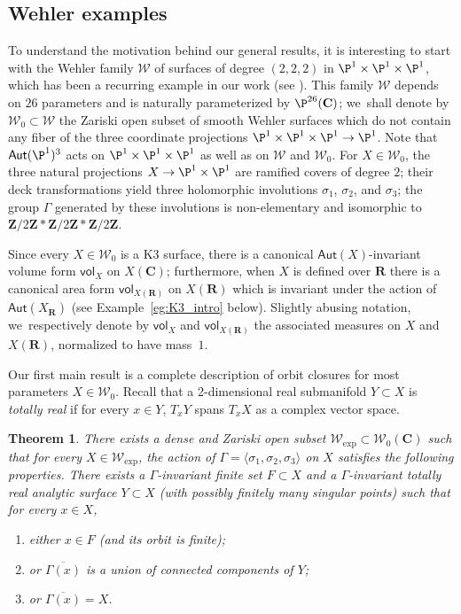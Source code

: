 \documentclass[JEP,XML,SOM,Unicode,published]{cedram}
\newenvironment{enumeratea}
{\bgroup\def\theenumi{\alph{enumi}}\begin{enumerate}}
{\end{enumerate}\egroup}
\def\C{\mathbf{C}}
\def\R{\mathbf{R}}
\def\Z{\mathbf{Z}}
\newcommand{\cW}{\mathcal{W}}
\newcommand\Aut{\mathsf{Aut}}
\newcommand{\vol}{{\mathsf{vol}}}
\theoremstyle{plain}
\newtheorem{thm}{Theorem}[section]
\theoremstyle{definition}
\begin{document}
\subsection{Wehler examples} \label{subs:wehler}
To understand the motivation behind our general results,
it is interesting to start with the Wehler family $ \cW$ of
surfaces of degree $(2,2,2)$ in $\P^1\times \P^1\times \P^1$, which has been a
recurring example in our work (see \eg \cite[\S 3]{stiffness}).
This family $ \cW$ depends on $26$ parameters and is naturally parameterized by
$\P^{26}(\C)$; we~shall denote by $ \cW_0\subset \cW$ the
Zariski open subset of smooth Wehler surfaces which do not contain any fiber of the three coordinate projections $\P^1\times \P^1\times \P^1\to \P^1$. Note that $\Aut(\P^1)^3$ acts on $\P^1\times\P^1\times \P^1$ as well as on $\cW$ and $\cW_0$.
For $X\in \cW_0$, the three natural projections $X\to \P^1\times \P^1$ are ramified covers of degree $2$; their deck transformations yield three holomorphic
involutions $\sigma_1$, $\sigma_2$, and $\sigma_3$;
the group $\Gamma$ generated by these involutions is non-elementary and isomorphic to
$\Z/2\Z\ast\Z/2\Z\ast\Z/2\Z$.

Since every $X\in \cW_0$ is a K3 surface,
there is a canonical $\Aut(X)$-invariant volume form $\vol_X$ on $X(\C)$; furthermore,
when $X$ is defined over $\R$ there is a canonical area form $\vol_{X(\R)}$
on $X(\R)$ which is invariant under the action of $\Aut(X_\R)$ (see Example~\ref{eg:K3_intro} below).
Slightly abusing notation, we~respectively denote by $\vol_X$ and $\vol_{X(\R)}$
the associated measures on $X$ and $X(\R)$, normalized to
have mass~$1$.

Our first main result is a complete description of orbit closures for
most parameters $X\in \cW_0$.
Recall that a 2-dimensional real submanifold
$Y\subset X$ is \emph{totally real} if for every $x\in Y$, $T_xY$ spans $T_xX$ as a
complex vector space.

\begin{thm}\label{thm:orbits_wehler}
There exists a dense and Zariski open subset
$ \cW_{\mathrm{exp}}\subset \cW_0(\C)$
such that for every $X\in \cW_{\mathrm{exp}}$, the action of $\Gamma=\langle \sigma_1, \sigma_2, \sigma_3\rangle$ on $X$ satisfies the following properties. There exists
a $\Gamma$-invariant finite set $F\subset X$ and
a $\Gamma$-invariant totally real analytic surface $Y\subset X$ (with possibly finitely many singular points)
such that for {\rm{every}} $x\in X$,
\begin{enumeratea}
\item\label{thm:orbits_wehlera} either $x\in F$ (and its orbit is finite);
\item or $\overline{\Gamma(x)}$ is a union of connected components of $Y$;
\item\label{thm:orbits_wehlerb} or $\overline{\Gamma(x)} = X$.
\end{enumeratea}
\end{thm}
\end{document}
